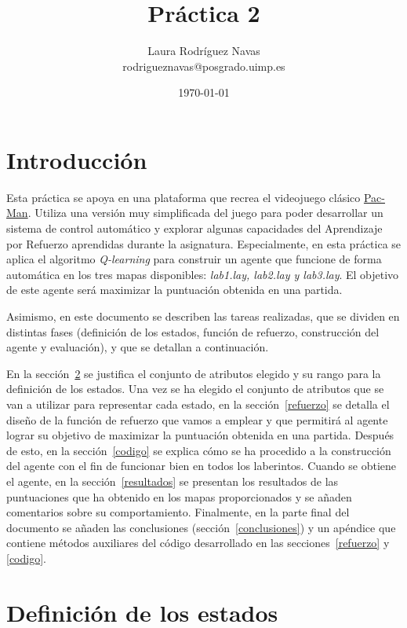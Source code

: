\documentclass[11pt]{exam}
\title{Práctica 2}
\author{Laura Rodríguez Navas \\ rodrigueznavas@posgrado.uimp.es}
\date{{\selectlanguage{spanish}\today} }
\begin{document}
	
\maketitle

\renewcommand{\tablename}{Tabla}
\renewcommand{\lstlistingname}{Código}

\section{Introducción}\label{introduccion}

Esta práctica se apoya en una plataforma que recrea el videojuego clásico \href{1https://en.wikipedia.org/wiki/Pac-Man}{Pac-Man}. Utiliza una versión muy simplificada del juego para poder desarrollar un sistema de control automático y explorar algunas capacidades del Aprendizaje por Refuerzo aprendidas durante la asignatura. Especialmente, en esta práctica se aplica el algoritmo \textit{Q-learning} para construir un agente que funcione de forma automática en los tres mapas disponibles: \textit{lab1.lay, lab2.lay y lab3.lay}. El objetivo de este agente será maximizar la puntuación obtenida en una partida.

Asimismo, en este documento se describen las tareas realizadas, que se dividen en distintas fases (definición de los estados, función de refuerzo, construcción del agente y evaluación), y que se detallan a continuación.

En la sección~\ref{estados} se justifica el conjunto de atributos elegido y su rango para la definición de los estados. Una vez se ha elegido el conjunto de atributos que se van a utilizar para representar cada estado, en la sección~\ref{refuerzo} se detalla el diseño de la función de refuerzo que vamos a emplear y que permitirá al agente lograr su objetivo de maximizar la puntuación obtenida en una partida. Después de esto, en la sección~\ref{codigo} se explica cómo se ha procedido a la construcción del agente con el fin de funcionar bien en todos los laberintos. Cuando se obtiene el agente, en la sección~\ref{resultados} se presentan los resultados de las puntuaciones que ha obtenido en los mapas proporcionados y se añaden comentarios sobre su comportamiento. Finalmente, en la parte final del documento se añaden las conclusiones (sección~\ref{conclusiones}) y un apéndice que contiene métodos auxiliares del código desarrollado en las secciones~\ref{refuerzo} y \ref{codigo}.

\section{Definición de los estados}\label{estados}
\end{document}
